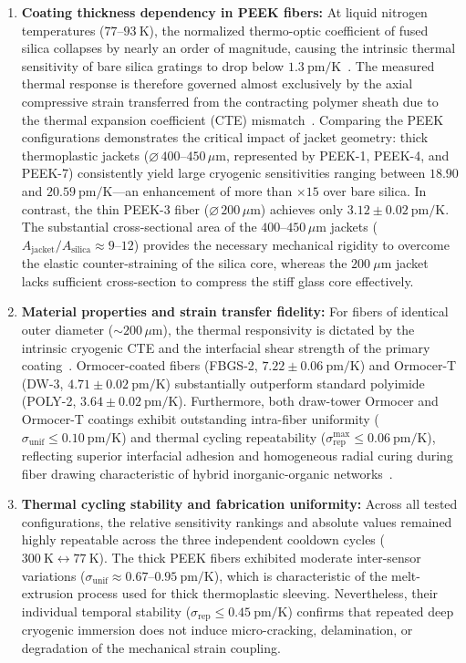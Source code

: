 \documentclass[preprint,11pt]{elsarticle}
\begin{document}
\begin{enumerate}
    \item \textbf{Coating thickness dependency in PEEK fibers:} At liquid nitrogen temperatures ($77$--$93~\text{K}$), the normalized thermo-optic coefficient of fused silica collapses by nearly an order of magnitude, causing the intrinsic thermal sensitivity of bare silica gratings to drop below $1.3~\text{pm/K}$~\cite{Lupi2008,Salin2008,Rajan2013}. The measured thermal response is therefore governed almost exclusively by the axial compressive strain transferred from the contracting polymer sheath due to the thermal expansion coefficient (CTE) mismatch~\cite{Rajan2013,NIST_CryoMaterials}. Comparing the PEEK configurations demonstrates the critical impact of jacket geometry: thick thermoplastic jackets ($\varnothing\,400$--$450\,\mu\text{m}$, represented by PEEK-1, PEEK-4, and PEEK-7) consistently yield large cryogenic sensitivities ranging between $18.90$ and $20.59~\text{pm/K}$—an enhancement of more than $\times 15$ over bare silica. In contrast, the thin PEEK-3 fiber ($\varnothing\,200\,\mu\text{m}$) achieves only $3.12 \pm 0.02~\text{pm/K}$. The substantial cross-sectional area of the $400$--$450\,\mu\text{m}$ jackets ($A_{\text{jacket}}/A_{\text{silica}} \approx 9$--$12$) provides the necessary mechanical rigidity to overcome the elastic counter-straining of the silica core, whereas the $200~\mu\text{m}$ jacket lacks sufficient cross-section to compress the stiff glass core effectively.

    \item \textbf{Material properties and strain transfer fidelity:} For fibers of identical outer diameter ($\sim 200\,\mu\text{m}$), the thermal responsivity is dictated by the intrinsic cryogenic CTE and the interfacial shear strength of the primary coating~\cite{Zhao2007,NIST_CryoMaterials}. Ormocer-coated fibers (FBGS-2, $7.22 \pm 0.06~\text{pm/K}$) and Ormocer-T (DW-3, $4.71 \pm 0.02~\text{pm/K}$) substantially outperform standard polyimide (POLY-2, $3.64 \pm 0.02~\text{pm/K}$). Furthermore, both draw-tower Ormocer and Ormocer-T coatings exhibit outstanding intra-fiber uniformity ($\sigma_{\text{unif}} \le 0.10~\text{pm/K}$) and thermal cycling repeatability ($\sigma_{\text{rep}}^{\max} \le 0.06~\text{pm/K}$), reflecting superior interfacial adhesion and homogeneous radial curing during fiber drawing characteristic of hybrid inorganic-organic networks~\cite{Popall1998}.

    \item \textbf{Thermal cycling stability and fabrication uniformity:} Across all tested configurations, the relative sensitivity rankings and absolute values remained highly repeatable across the three independent cooldown cycles ($300~\text{K} \leftrightarrow 77~\text{K}$). The thick PEEK fibers exhibited moderate inter-sensor variations ($\sigma_{\text{unif}} \approx 0.67$--$0.95~\text{pm/K}$), which is characteristic of the melt-extrusion process used for thick thermoplastic sleeving. Nevertheless, their individual temporal stability ($\sigma_{\text{rep}} \le 0.45~\text{pm/K}$) confirms that repeated deep cryogenic immersion does not induce micro-cracking, delamination, or degradation of the mechanical strain coupling.
\end{enumerate}
\end{document}
